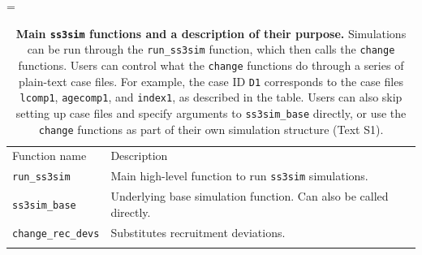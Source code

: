 \documentclass[11pt]{article}
\begin{document}
\begin{small}
\LTcapwidth=\textwidth
\begin{longtable}[c]{@{}ll@{}}
\caption{\textbf{Main \texttt{ss3sim} functions and a description of their purpose.} Simulations can be run through the \texttt{run\_ss3sim} function, which then calls the \texttt{change} functions. Users can control what the \texttt{change} functions do through a series of plain-text case files. For example, the case ID \texttt{D1} corresponds to the case files \texttt{lcomp1}, \texttt{agecomp1}, and \texttt{index1}, as described in the table. Users can also skip setting up case files and specify arguments to \texttt{ss3sim\_base} directly, or use the \texttt{change} functions as part of their own simulation structure (Text S1).}\\
\hline\noalign{\medskip}
\begin{minipage}[b]{0.32\columnwidth}\raggedright
Function name
\end{minipage} & \begin{minipage}[b]{0.57\columnwidth}\raggedright
Description
\end{minipage}
\\\noalign{\medskip}
\hline\noalign{\medskip}
\begin{minipage}[t]{0.32\columnwidth}\raggedright
\texttt{run\_ss3sim}
\end{minipage} & \begin{minipage}[t]{0.57\columnwidth}\raggedright
Main high-level function to run \texttt{ss3sim} simulations.
\end{minipage}
\\\noalign{\medskip}
\begin{minipage}[t]{0.32\columnwidth}\raggedright
\texttt{ss3sim\_base}
\end{minipage} & \begin{minipage}[t]{0.57\columnwidth}\raggedright
Underlying base simulation function. Can also be called directly.
\end{minipage}
\\\noalign{\medskip}
\begin{minipage}[t]{0.32\columnwidth}\raggedright
\texttt{change\_rec\_devs}
\end{minipage} & \begin{minipage}[t]{0.57\columnwidth}\raggedright
Substitutes recruitment deviations.
\end{minipage}
\\\noalign{\medskip}
\begin{minipage}[t]{0.32\columnwidth}\raggedright

\end{minipage}
\end{longtable}
\end{small}
\end{document}
